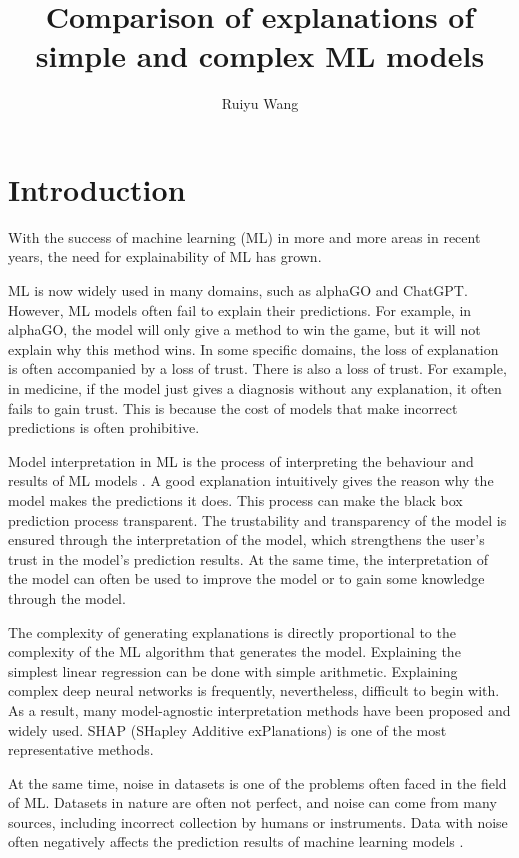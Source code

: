 \documentclass[runningheads,a4paper]{llncs}
\title{Comparison of explanations of simple and complex ML models}
\author{Ruiyu Wang}
\institute{MSc in Advanced Computer Science, \\ School of Computing Science,
        University of Newcastle, U. K. \\
        \email{r.wang57@ncl.ac.uk}
}
\begin{document}
\maketitle

\section{Introduction}

With the success of machine learning (ML) in more and more areas in recent years, the need for explainability of ML has grown.

ML is now widely used in many domains, such as alphaGO and ChatGPT.
However, ML models often fail to explain their predictions. For example,  in alphaGO, the model will only give a method to win the game, but it will not explain why this method wins.
In some specific domains, the loss of explanation is often accompanied by a loss of trust.
There is also a loss of trust. 
For example, in medicine, if the model just gives a diagnosis without any explanation, it often fails to gain trust. This is because the cost of models that make incorrect predictions is often prohibitive.

Model interpretation in ML is the process of interpreting the behaviour and results of ML models \cite{doshivelez2017rigorous}.
A good explanation intuitively gives the reason why the model makes the predictions it does.
This process can make the black box prediction process transparent.\cite{8466590}
The trustability and transparency of the model is ensured through the interpretation of the model\cite{arrieta2020explainable}\cite{Molnar2020}, which strengthens the user's trust in the model's prediction results.
At the same time, the interpretation of the model can often be used to improve the model or to gain some knowledge through the model.\cite{8466590}

The complexity of generating explanations is directly proportional to the complexity of the ML algorithm that generates the model.
Explaining the simplest linear regression can be done with simple arithmetic. Explaining complex deep neural networks is frequently, nevertheless, difficult to begin with.
As a result, many model-agnostic interpretation methods have been proposed and widely used.
SHAP (SHapley Additive exPlanations)\cite{lundberg2017unified} is one of the most representative methods.

At the same time, noise in datasets is one of the problems often faced in the field of ML.
Datasets in nature are often not perfect, and noise can come from many sources, including incorrect collection by humans or instruments.
Data with noise often negatively affects the prediction results of machine learning models \cite{GUPTA2019466}\cite{saseendran2019impact}.
\end{document}
